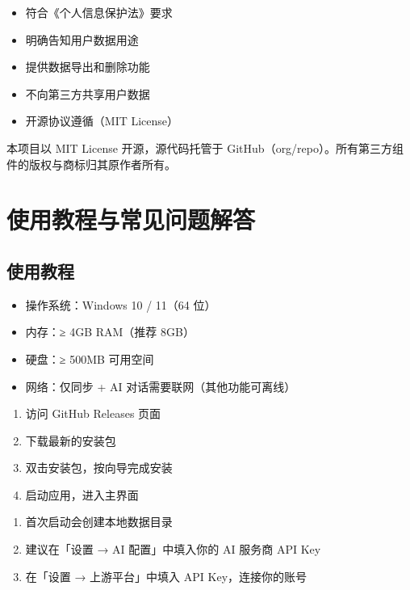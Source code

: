 \documentclass[12pt,a4paper,nomath]{harryopo-report}
\begin{document}
\begin{itemize}
    \item 符合《个人信息保护法》要求
    \item 明确告知用户数据用途
    \item 提供数据导出和删除功能
    \item 不向第三方共享用户数据
    \item 开源协议遵循（MIT License）
\end{itemize}

本项目以 MIT License 开源，源代码托管于 GitHub（org/repo）。所有第三方组件的版权与商标归其原作者所有。

\chapter{使用教程与常见问题解答}

\section{使用教程}

\begin{itemize}
    \item 操作系统：Windows 10 / 11（64 位）
    \item 内存：≥ 4GB RAM（推荐 8GB）
    \item 硬盘：≥ 500MB 可用空间
    \item 网络：仅同步 + AI 对话需要联网（其他功能可离线）
\end{itemize}

\begin{enumerate}
    \item 访问 GitHub Releases 页面
    \item 下载最新的安装包
    \item 双击安装包，按向导完成安装
    \item 启动应用，进入主界面
\end{enumerate}

\begin{enumerate}
    \item 首次启动会创建本地数据目录
    \item 建议在「设置 → AI 配置」中填入你的 AI 服务商 API Key
    \item 在「设置 → 上游平台」中填入 API Key，连接你的账号
\end{enumerate}
\end{document}
